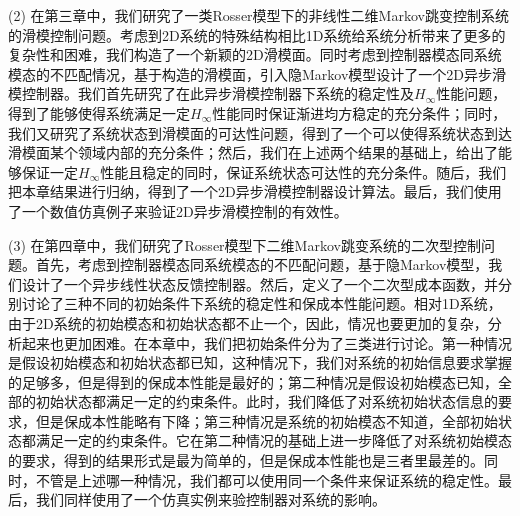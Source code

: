 	(2) 在第三章中，我们研究了一类Rosser模型下的非线性二维Markov跳变控制系统的滑模控制问题。考虑到2D系统的特殊结构相比1D系统给系统分析带来了更多的复杂性和困难，我们构造了一个新颖的2D滑模面。同时考虑到控制器模态同系统模态的不匹配情况，基于构造的滑模面，引入隐Markov模型设计了一个2D异步滑模控制器。我们首先研究了在此异步滑模控制器下系统的稳定性及$H_\infty$性能问题，得到了能够使得系统满足一定$H_\infty$性能同时保证渐进均方稳定的充分条件；同时，我们又研究了系统状态到滑模面的可达性问题，得到了一个可以使得系统状态到达滑模面某个领域内部的充分条件；然后，我们在上述两个结果的基础上，给出了能够保证一定$H_\infty$性能且稳定的同时，保证系统状态可达性的充分条件。随后，我们把本章结果进行归纳，得到了一个2D异步滑模控制器设计算法。最后，我们使用了一个数值仿真例子来验证2D异步滑模控制的有效性。
	
	(3) 在第四章中，我们研究了Rosser模型下二维Markov跳变系统的二次型控制问题。首先，考虑到控制器模态同系统模态的不匹配问题，基于隐Markov模型，我们设计了一个异步线性状态反馈控制器。然后，定义了一个二次型成本函数，并分别讨论了三种不同的初始条件下系统的稳定性和保成本性能问题。相对1D系统，由于2D系统的初始模态和初始状态都不止一个，因此，情况也要更加的复杂，分析起来也更加困难。在本章中，我们把初始条件分为了三类进行讨论。第一种情况是假设初始模态和初始状态都已知，这种情况下，我们对系统的初始信息要求掌握的足够多，但是得到的保成本性能是最好的；第二种情况是假设初始模态已知，全部的初始状态都满足一定的约束条件。此时，我们降低了对系统初始状态信息的要求，但是保成本性能略有下降；第三种情况是系统的初始模态不知道，全部初始状态都满足一定的约束条件。它在第二种情况的基础上进一步降低了对系统初始模态的要求，得到的结果形式是最为简单的，但是保成本性能也是三者里最差的。同时，不管是上述哪一种情况，我们都可以使用同一个条件来保证系统的稳定性。最后，我们同样使用了一个仿真实例来验控制器对系统的影响。
	
	
	
	
	
	